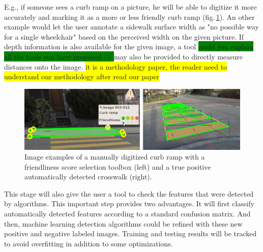 \documentclass[10pt,conference,a4paper]{IEEEtran}
\begin{document}
E.g., if someone sees a curb ramp on a picture, he will be able to digitize it more accurately and marking it as a more or less friendly curb ramp (fig.\,\ref{curbramppicture}). An other example would let the user annotate a sidewalk surface width as %
"no possible way for a single wheelchair" based on the perceived width on the given picture. If depth information is also available for the given image, 
a tool \colorbox{green}{could you explain all the tools you have proposed ->	} may also be provided to directly measure distances onto the image.
\colorbox{yellow}{it is a methodology paper, the reader need to understand our methodology after read our paper}



\begin{figure}[ht]
\begin{center}
\includegraphics[width=1.0\linewidth]{curb_ramp_crosswalk01.jpg}
\end{center}
   \caption{Image examples of a manually digitized curb ramp with a friendliness score selection toolbox (left) and a true positive automatically detected crosswalk (right).}\label{curbramppicture}
\end{figure}


This stage will also give the user a tool to check the features that were detected by algorithms. This important step provides two advantages. It will first classify automatically detected features according to a standard confusion matrix. And then, machine learning detection algorithms could be refined with these new positive and negative labeled images. Training and testing results will be tracked to avoid overfitting in addition to some optimizations.
\end{document}
